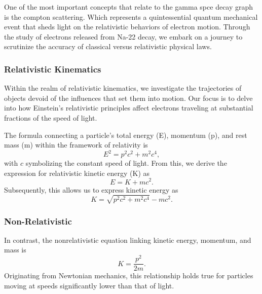 \documentclass[12pt]{article}
\begin{document}
        One of the most important concepts that relate to the gamma spce decay graph is the compton scattering. Which represents a 
        quintessential quantum mechanical event that sheds light on the relativistic 
        behaviors of electron motion. Through the study of electrons released from Na-22 decay, we embark on a journey 
        to scrutinize the accuracy of classical versus relativistic physical laws.
            
        \subsubsection{Relativistic Kinematics}
                Within the realm of relativistic kinematics, we investigate the trajectories of objects devoid of 
                the influences that set them into motion. Our focus is to delve into how Einstein's relativistic 
                principles affect electrons traveling at substantial fractions of the speed of light.
                
                The formula connecting a particle's total energy (E), momentum (p), and rest mass (m) within the framework of relativity is
                \begin{equation}
                E^2 = p^2c^2 + m^2c^4,
                \end{equation}
                with \( c \) symbolizing the constant speed of light. From this, we derive the expression for relativistic kinetic energy (K) as
                \begin{equation}
                E = K + mc^2.
                \end{equation}
                Subsequently, this allows us to express kinetic energy as
                \begin{equation}
                K = \sqrt{p^2c^2 + m^2c^4} - mc^2.
                \end{equation}

            
            \subsubsection{Non-Relativistic}                
                    In contrast, the nonrelativistic equation linking kinetic energy, momentum, and mass is
                    \begin{equation}
                    K = \frac{p^2}{2m}.
                    \end{equation}
                    Originating from Newtonian mechanics, this relationship holds true for particles moving at speeds significantly lower than that of light.
            
\end{document}
